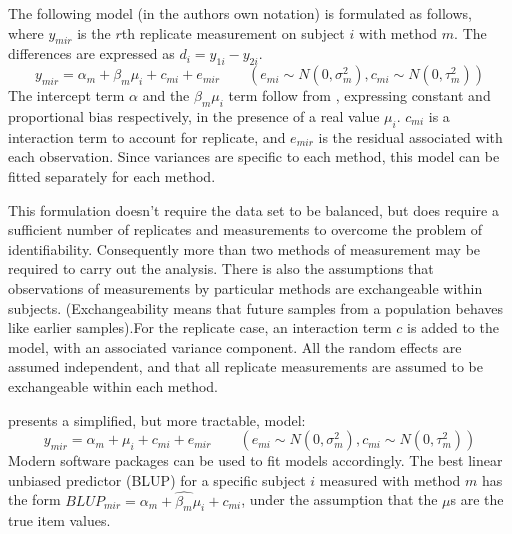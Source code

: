 \documentclass[12pt, a4paper]{report}
\theoremstyle{plain}
\theoremstyle{definition}
\theoremstyle{remark}
\begin{document}
	The following model (in the authors own notation) is
	formulated as follows, where $y_{mir}$ is the $r$th replicate
	measurement on subject $i$ with method $m$. The differences are expressed as $d_{i} = y_{1i} - y_{2i}$.
	\begin{equation}
	y_{mir}  = \alpha_{m} + \beta_{m}\mu_{i} + c_{mi} + e_{mir} \qquad
	( e_{mi} \sim N(0,\sigma^{2}_{m}), c_{mi} \sim N(0,\tau^{2}_{m}))
	\end{equation}
	The intercept term $\alpha$ and the $\beta_{m}\mu_{i}$ term follow from \citet{DunnSEME}, expressing constant and proportional bias
	respectively, in the presence of a real value $\mu_{i}$. $c_{mi}$ is a interaction term to account for replicate, and $e_{mir}$ is the residual associated with each observation. Since variances are specific to each method, this model can be
	fitted separately for each method.
	
	This formulation doesn't require the data set to be balanced, but does require a sufficient number of replicates
	and measurements to overcome the problem of identifiability. Consequently more than two methods of measurement may
	be required to carry out the analysis. There is also the assumptions that observations of measurements by particular methods are exchangeable within subjects. (Exchangeability means that future samples from a population behaves like earlier
	samples).For the replicate case, an interaction term $c$ is added to the model, with an associated variance component. All the random effects are assumed independent, and that all replicate measurements are assumed to be exchangeable within each method. 
	
	\citet{BXC2008} presents a simplified, but more tractable, model:
	\begin{equation}
	y_{mir}  = \alpha_{m} + \mu_{i} + c_{mi} + e_{mir} \qquad ( e_{mi}
	\sim N(0,\sigma^{2}_{m}), c_{mi} \sim N(0,\tau^{2}_{m}))
	\end{equation}
	Modern software packages can be used to fit models accordingly. The best linear unbiased predictor (BLUP) for a specific subject $i$ measured with method $m$ has the form $BLUP_{mir} = \hat{\alpha_{m}} +
	\hat{\beta_{m}}\mu_{i} + c_{mi}$, under the assumption that the
	$\mu$s are the true item values.
	
	
	
	
\end{document}
